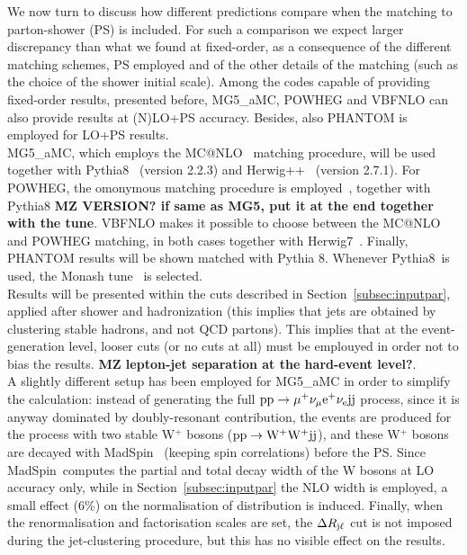 We now turn to discuss how different predictions compare when the matching to parton-shower (PS) is included. For such
a comparison we expect larger discrepancy than what we found at fixed-order, as a consequence of the different
matching schemes, PS employed and of the other details of the matching (such as the choice of the shower initial scale). Among
the codes capable of providing fixed-order results, presented before, {\sc MG5\_aMC}, {\sc POWHEG} and {\sc VBFNLO}
can also provide results at (N)LO+PS accuracy. Besides, also {\sc PHANTOM} is employed for LO+PS results.\\
{\sc MG5\_aMC},
which
employs the {\sc MC@NLO}~\cite{Frixione:2002ik} matching procedure, will be used together with {\sc Pythia8}~\cite{Sjostrand:2014zea} (version 2.2.3) 
and {\sc Herwig++}~\cite{Bahr:2008pv, Bellm:2013hwb} (version 2.7.1). For {\sc POWHEG}, the omonymous matching procedure is 
employed~\cite{Nason:2004rx,Frixione:2007vw}, together with {\sc Pythia8} 
{\bf MZ VERSION? if same as MG5, put it at the end together with the tune}. {\sc VBFNLO} makes it possible to choose between the {\sc MC@NLO} and {\sc POWHEG}
matching, in both cases together with {\sc Herwig7}~\cite{}. Finally, {\sc PHANTOM} results will be shown matched with {\sc Pythia 8}.
Whenever {\sc Pythia8}\ is used, the Monash tune~\cite{Skands:2014pea} is selected.\\

Results will be presented within the cuts described in Section~\ref{subsec:inputpar}, applied after shower and hadronization (this implies that jets
are obtained by clustering stable hadrons, and not QCD partons). This implies that at the event-generation level, looser cuts (or no cuts at all) 
must be emplouyed in order not to bias the results. {\bf MZ lepton-jet separation at the hard-event level?}.\\

A slightly different setup has been employed for {\sc MG5\_aMC} in order to simplify the calculation: instead of generating the full 
${\rm p}{\rm p}\to\mu^+\nu_\mu{\rm e}^+\nu_{\rm e}{\rm j}{\rm j}$ process, since it is anyway dominated by doubly-resonant contribution, the 
events are produced for the process with two stable W$^+$ bosons (${\rm p}{\rm p}\to{\rm W^+}{\rm W^+}{\rm j}{\rm j}$), and these W$^+$ bosons
are decayed with {\sc MadSpin}~\cite{Artoisenet:2012st} (keeping spin correlations) before the PS. Since {\sc MadSpin}\ computes 
the partial and total decay width of the W bosons at LO accuracy only, while in Section~\ref{subsec:inputpar} the NLO width is employed, 
a small effect (6\%) on the normalisation of distribution is induced. Finally, when the renormalisation
and factorisation scales are set, the $\Delta R_{\text{j}\ell}$ cut is not imposed during the jet-clustering procedure, but this has no visible effect 
on the results.

